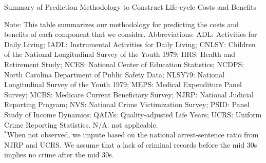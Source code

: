 \begin{table}
\begin{threeparttable}
\caption{Summary of Prediction Methodology to Construct Life-cycle Costs and Benefits} \label{table:sources}
\tiny

\begin{tablenotes}
\scriptsize
Note: This table summarizes our methodology for predicting the costs and benefits of each component that we consider. Abbreviations: ADL: Activities for Daily Living; IADL: Instrumental Activities for Daily Living; CNLSY: Children of the National Longitudinal Survey of the Youth 1979;  HRS: Health and Retirement Study; NCES: National Center of Education Statistics; NCDPS: North Carolina Department of Public Safety Data; NLSY79: National Longitudinal Survey of the Youth 1979; MEPS: Medical Expenditure Panel Survey; MCBS: Medicare Current Beneficiary Survey; NJRP: National Judicial Reporting Program; NVS: National Crime Victimization Survey; PSID: Panel Study of Income Dynamics; QALYs: Quality-adjusted Life Years; UCRS: Uniform Crime Reporting Statistics. N/A: not applicable. \\
$^*$When not observed, we impute based on the national arrest-sentence ratio  from NJRP and UCRS. We assume that a lack of criminal records before the mid 30s implies no crime after the mid 30s. \\
\end{tablenotes}
\end{threeparttable}
\end{table}

